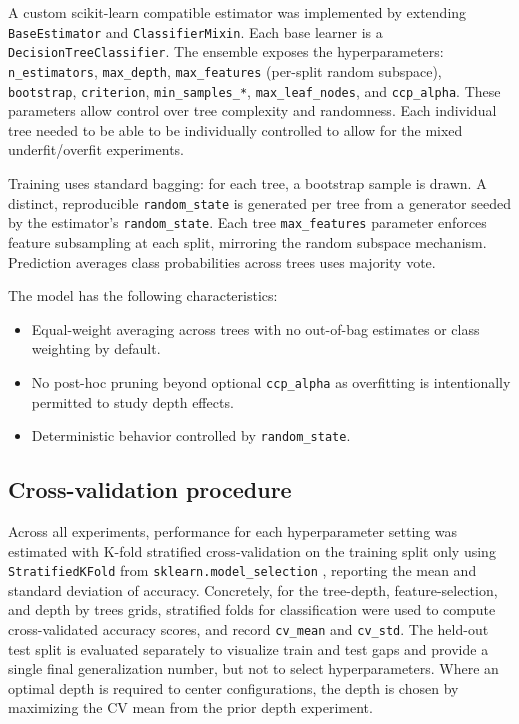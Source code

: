 \documentclass[conference]{IEEEtran}
\begin{document}
A custom scikit-learn compatible estimator was implemented by extending \texttt{BaseEstimator} and \texttt{ClassifierMixin}. Each base learner is a \texttt{DecisionTreeClassifier}. The 
ensemble exposes the hyperparameters: \texttt{n\_estimators}, \texttt{max\_depth}, \texttt{max\_features} (per-split random subspace), \texttt{bootstrap}, \texttt{criterion}, 
\texttt{min\_samples\_*}, \texttt{max\_leaf\_nodes}, and \texttt{ccp\_alpha}. These parameters allow control over tree complexity and randomness. Each individual tree needed 
to be able to be individually controlled to allow for the mixed underfit/overfit experiments.

Training uses standard bagging: for each tree, a bootstrap sample is drawn. A distinct, reproducible \texttt{random\_state} is generated per tree from a generator seeded by the estimator's
 \texttt{random\_state}. Each tree \texttt{max\_features} parameter enforces feature subsampling at each split, mirroring the random subspace mechanism. Prediction averages class probabilities across trees uses majority vote.

The model has the following characteristics:
\begin{itemize}
  \item Equal-weight averaging across trees with no out-of-bag estimates or class weighting by default.
  \item No post-hoc pruning beyond optional \texttt{ccp\_alpha} as overfitting is intentionally permitted to study depth effects.
  \item Deterministic behavior controlled by \texttt{random\_state}.
\end{itemize}


\subsection{Cross-validation procedure}
Across all experiments, performance for each hyperparameter setting was estimated with K-fold stratified cross-validation on the training split only using \texttt{StratifiedKFold} from \texttt{sklearn.model\_selection} \cite{scikit-learn}, 
reporting the mean and standard deviation of accuracy. Concretely, for the tree-depth, feature-selection, and depth by trees grids, stratified folds for classification
were used to compute cross-validated accuracy scores, and record \texttt{cv\_mean} and \texttt{cv\_std}. The held-out test split is evaluated separately to
visualize train and test gaps and provide a single final generalization number, but not to select hyperparameters. Where an optimal depth is required to center 
 configurations, the depth is chosen by maximizing the CV mean from the prior depth experiment.
\end{document}
